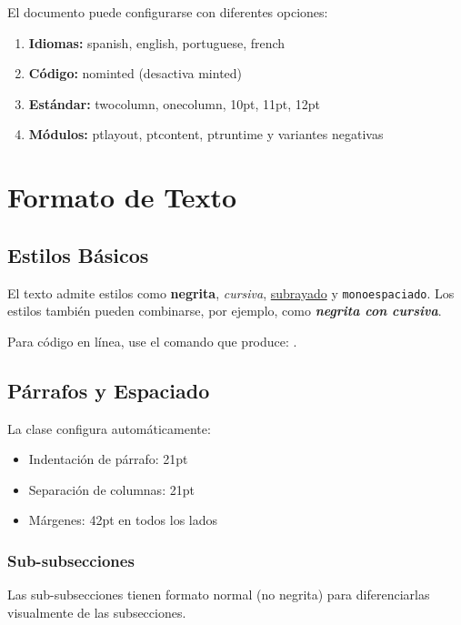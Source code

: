\documentclass{pt-article}
\begin{document}
El documento puede configurarse con diferentes opciones:

\begin{enumerate}
    \item \textbf{Idiomas:} spanish, english, portuguese, french
    \item \textbf{Código:} nominted (desactiva minted)
    \item \textbf{Estándar:} twocolumn, onecolumn, 10pt, 11pt, 12pt
    \item \textbf{Módulos:} ptlayout, ptcontent, ptruntime y variantes negativas
\end{enumerate}

\section{Formato de Texto}

\subsection{Estilos Básicos}

El texto admite estilos como \textbf{negrita}, \textit{cursiva},
\underline{subrayado} y \texttt{monoespaciado}. Los estilos también pueden
combinarse, por ejemplo, como \textbf{\textit{negrita con cursiva}}.

Para código en línea, use el comando 
que produce: .

\subsection{Párrafos y Espaciado}

La clase configura automáticamente:
\begin{itemize}
    \item Indentación de párrafo: 21pt
    \item Separación de columnas: 21pt
    \item Márgenes: 42pt en todos los lados
\end{itemize}

\subsubsection{Sub-subsecciones}

Las sub-subsecciones tienen formato normal (no negrita) para diferenciarlas
visualmente de las subsecciones.
\end{document}
